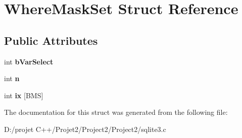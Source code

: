 \hypertarget{struct_where_mask_set}{}\section{Where\+Mask\+Set Struct Reference}
\label{struct_where_mask_set}
\subsection*{Public Attributes}
\begin{DoxyCompactItemize}
\item 
\mbox{\label{struct_where_mask_set_a04925644819000d2cfad8afee6f57d61}} 
int {\bfseries b\+Var\+Select}
\item 
\mbox{\label{struct_where_mask_set_a09923e1dee2157c78c5ae0df65e8ee7c}} 
int {\bfseries n}
\item 
\mbox{\label{struct_where_mask_set_a9de4e7b27d4f793f37c1ead7b44ecb48}} 
int {\bfseries ix} \mbox{[}B\+MS\mbox{]}
\end{DoxyCompactItemize}


The documentation for this struct was generated from the following file\+:\begin{DoxyCompactItemize}
\item 
D\+:/projet C++/\+Projet2/\+Project2/\+Project2/sqlite3.\+c\end{DoxyCompactItemize}
